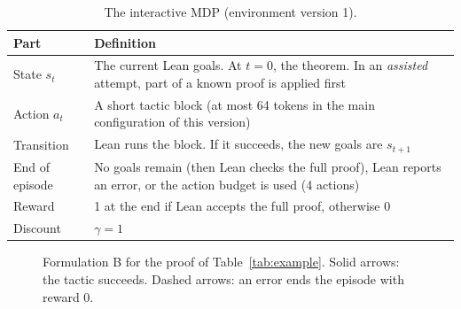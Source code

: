 \documentclass[11pt]{article}
\begin{document}
\begin{table}[!htbp]
\centering
\small
\caption{The interactive MDP (environment version 1).}
\label{tab:mdp}
\begin{tabularx}{\textwidth}{@{}P{2.6cm}Y@{}}
\toprule
Part & Definition \\
\midrule
State $s_t$ & The current Lean goals. At $t = 0$, the theorem. In an \emph{assisted} attempt, part of a known proof is applied first \\
Action $a_t$ & A short tactic block (at most 64 tokens in the main configuration of this version) \\
Transition & Lean runs the block. If it succeeds, the new goals are $s_{t+1}$ \\
End of episode & No goals remain (then Lean checks the full proof), Lean reports an error, or the action budget is used (4 actions) \\
Reward & 1 at the end if Lean accepts the full proof, otherwise 0 \\
Discount & $\gamma = 1$ \\
\bottomrule
\end{tabularx}
\end{table}

\begin{figure}[!htbp]
\centering
{}
\caption{Formulation B for the proof of Table~\ref{tab:example}. Solid arrows: the tactic succeeds. Dashed arrows: an error ends the episode with reward 0.}
\label{fig:mdpgraph}
\end{figure}
\end{document}

